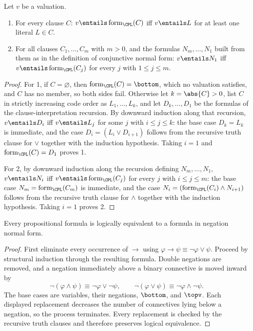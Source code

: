 \begin{lemma}
\label{lem:prop-clause-satisfaction}
Let \(v\) be a valuation.
\begin{enumerate}
  \item For every clause \(C\):
        \(v\entails\operatorname{form}_{\CPL}(C)\) iff
        \(v\entails L\) for at least one literal \(L\in C\).
  \item For all clauses \(C_1,\ldots,C_m\) with \(m>0\), and the formulas
        \(N_m,\ldots,N_1\) built from them as in the definition of
        conjunctive normal form: \(v\entails N_1\) iff
        \(v\entails\operatorname{form}_{\CPL}(C_j)\) for every \(j\) with
        \(1\leq j\leq m\).
\end{enumerate}
\end{lemma}
\begin{proof}
For 1, if \(C=\varnothing\), then
\(\operatorname{form}_{\CPL}(C)=\bottom\), which no valuation satisfies,
and \(C\) has no member, so both sides fail.  Otherwise let
\(k=\abs{C}>0\), list \(C\) in strictly increasing code order as
\(L_1,\ldots,L_k\), and let \(D_k,\ldots,D_1\) be the formulas of the
clause-interpretation recursion.  By downward induction along that
recursion, \(v\entails D_i\) iff \(v\entails L_j\) for some \(j\) with
\(i\leq j\leq k\): the base case \(D_k=L_k\) is immediate, and the case
\(D_i=(L_i\lor D_{i+1})\) follows from the recursive truth clause for
\(\lor\) together with the induction hypothesis.  Taking \(i=1\) and
\(\operatorname{form}_{\CPL}(C)=D_1\) proves 1.

For 2, by downward induction along the recursion defining
\(N_m,\ldots,N_1\), \(v\entails N_i\) iff
\(v\entails\operatorname{form}_{\CPL}(C_j)\) for every \(j\) with
\(i\leq j\leq m\): the base case \(N_m=\operatorname{form}_{\CPL}(C_m)\)
is immediate, and the case
\(N_i=(\operatorname{form}_{\CPL}(C_i)\land N_{i+1})\) follows from the
recursive truth clause for \(\land\) together with the induction
hypothesis.  Taking \(i=1\) proves 2.
\end{proof}

\begin{theorem}
\label{thm:p02-w02-p02-045-negation-normal-form}
Every propositional formula is logically equivalent to a formula in negation
normal form.
\end{theorem}
\begin{proof}
First eliminate every occurrence of \(\to\) using
\(\varphi\to\psi\equiv\neg\varphi\lor\psi\).  Proceed by structural
induction through the resulting formula.  Double negations are removed, and a
negation immediately above a binary connective is moved inward by
\[
 \neg(\varphi\land\psi)\equiv\neg\varphi\lor\neg\psi,
 \qquad
 \neg(\varphi\lor\psi)\equiv\neg\varphi\land\neg\psi.
\]
The base cases are variables, their negations, \(\bottom\), and \(\topv\).
Each displayed replacement decreases the number of connectives lying below a
negation, so the process terminates.  Every replacement is checked by the
recursive truth clauses and therefore preserves logical equivalence.
\end{proof}

